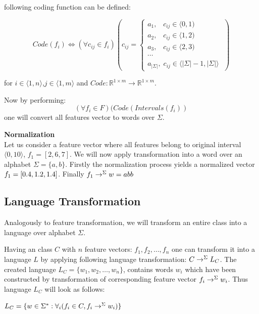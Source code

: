 \documentclass{mini}
\begin{document}
following coding function can be defined:

\begin{equation}
Code(f_i) \Leftrightarrow (\forall{c_{ij} \in f_i})(c_{ij} = 
\begin{cases}
a_1 , \;\;\; c_{ij} \in  \langle 0 , 1)  \\
a_2 , \;\;\; c_{ij} \in  \langle 1 , 2 ) \\
a_3 , \;\;\; c_{ij} \in  \langle 2 , 3 )\\
\cdots \\
a_{|\Sigma|} , \; c_{ij} \in \langle |\Sigma| -1, |\Sigma|  \rangle\; 
\end{cases})
\end{equation}

for $i \in \langle 1, n \rangle$,$j \in \langle 1, m \rangle$ and $Code : \mathbb{R}^{1 \times m} \rightarrow \mathbb{R}^{1 \times m}$. 

Now by performing:
\begin{equation}
(\forall{f_i \in F})(Code(Intervals(f_i))
\end{equation}
one will convert all features vector to words over $\Sigma$.

\begin{example} {\bf Normalization}\\
    Let us consider a feature vector where all features belong to original interval $\langle 0, 10 \rangle$, $f_1=[2, 6, 7]$. We will now apply transformation into a word over an alphabet $\Sigma=\{a,b\}$. Firstly the normalization process yields a normalized vector $f_1=[0.4, 1.2, 1.4]$. Finally $f_1 \rightarrow^{\Sigma}w=abb$
\end{example}


\subsection{Language Transformation}\label{sec:lan_theory_transf_lan}
Analogously to feature transformation, we will transform an entire class into a language over alphabet $\Sigma$.

Having an class $C$ with $n$ feature vectors: $f_1, f_2,\ldots,f_n$ one can transform it into a language $L$ by applying following language transformation: $C \rightarrow^{\Sigma} L_{C}$. The created language $L_{C} = \{w_1, w_2,\ldots,w_n\}$, contains words $w_i$ which have been constructed by transformation of corresponding feature vector $f_i \rightarrow^{\Sigma} w_i$. Thus language $L_{C}$ will look as follows:
\begin{center}
    $L_{C} = \{w \in \Sigma^{*} : \forall_{i} (f_{i} \in C, f_{i} \rightarrow^{\Sigma} w_{i}) \}$
\end{center}
\end{document}
